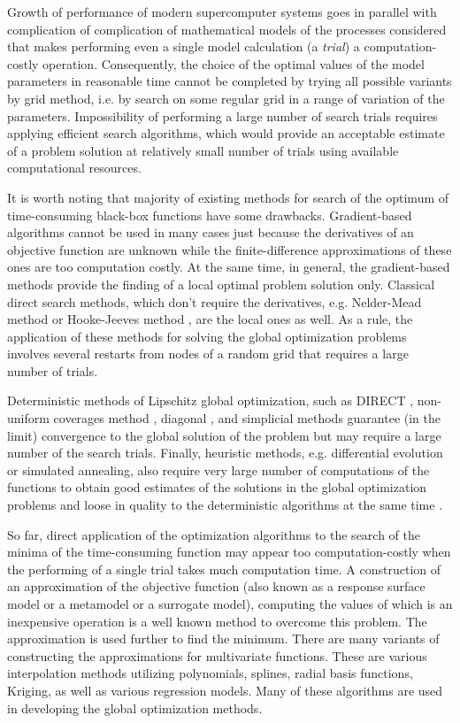 \documentclass[sensors,article,submit,moreauthors,pdftex]{Definitions/mdpi}
\begin{document}
Growth of performance of modern supercomputer systems goes in parallel with complication of complication of mathematical models of the processes considered that makes performing even a single model calculation (a \textit{trial}) a computation-costly operation. Consequently, the choice of the optimal values of the model parameters in reasonable time cannot be completed by trying all possible variants by grid method, i.e. by search on some regular grid in a range of variation of the parameters. Impossibility of performing a large number of search trials requires applying efficient search algorithms, which would provide an acceptable estimate of a problem solution at relatively small number of trials using available computational resources.

It is worth noting that majority of existing methods for search of the optimum of time-consuming black-box functions have some drawbacks. Gradient-based algorithms cannot be used in many cases just because the derivatives of an objective function are unknown while the finite-difference approximations of these ones are too computation costly. At the same time, in general, the gradient-based methods provide the finding of a local optimal problem solution only.
Classical direct search methods, which don't require the derivatives, e.g. Nelder-Mead method \cite{NelderMead} or Hooke-Jeeves method \cite{HookJeeves}, are the local ones as well. As a rule, the application of these methods for solving the global optimization problems involves several restarts from nodes of a random grid that requires a large number of trials. 

Deterministic methods of Lipschitz global optimization, such as DIRECT \cite{Jones2009}, non-uniform coverages method \cite{Evtushenko2009, Evtushenko2013}, diagonal \cite{Sergeyev2017}, and simplicial \cite{Zilinskas2014} methods guarantee (in the limit) convergence to the global solution of the problem but may require a large number of the search trials.
Finally, heuristic methods, e.g. differential evolution or simulated annealing, also require very large number of computations of the functions to obtain good estimates of the solutions in the global optimization problems and loose in quality to the deterministic algorithms at the same time \cite{Sergeyev2018,Kvasov2018}.

So far, direct application of the optimization algorithms to the search of the minima of the time-consuming function may appear too computation-costly when the performing of a single trial takes much computation time.
A construction of an approximation of the objective function (also known as a response surface model or a metamodel or a surrogate model), computing the values of which is an inexpensive operation is a well known method to overcome this problem. The approximation is used further to find the minimum.
There are many variants of constructing the approximations for multivariate functions. These are various interpolation methods utilizing polynomials, splines, radial basis functions, Kriging, as well as various regression models. Many of these algorithms are used in developing the global optimization methods.
\end{document}
